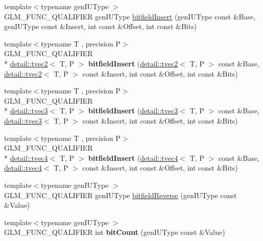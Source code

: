 \begin{DoxyCompactItemize}
\item 
{\footnotesize template$<$typename gen\-I\-U\-Type $>$ }\\G\-L\-M\-\_\-\-F\-U\-N\-C\-\_\-\-Q\-U\-A\-L\-I\-F\-I\-E\-R gen\-I\-U\-Type \hyperlink{group__core__func__integer_ga7ab09972d52094d97d2480982e657dd0}{bitfield\-Insert} (gen\-I\-U\-Type const \&Base, gen\-I\-U\-Type const \&Insert, int const \&Offset, int const \&Bits)
\item 
\hypertarget{namespaceglm_a3fe5875041ab0644094ed8866cfbf414}{{\footnotesize template$<$typename T , precision P$>$ }\\G\-L\-M\-\_\-\-F\-U\-N\-C\-\_\-\-Q\-U\-A\-L\-I\-F\-I\-E\-R \\*
\hyperlink{structglm_1_1detail_1_1tvec2}{detail\-::tvec2}$<$ T, P $>$ {\bfseries bitfield\-Insert} (\hyperlink{structglm_1_1detail_1_1tvec2}{detail\-::tvec2}$<$ T, P $>$ const \&Base, \hyperlink{structglm_1_1detail_1_1tvec2}{detail\-::tvec2}$<$ T, P $>$ const \&Insert, int const \&Offset, int const \&Bits)}\label{namespaceglm_a3fe5875041ab0644094ed8866cfbf414}

\item 
\hypertarget{namespaceglm_ac119fb710c26ac07213e39e16ce02b39}{{\footnotesize template$<$typename T , precision P$>$ }\\G\-L\-M\-\_\-\-F\-U\-N\-C\-\_\-\-Q\-U\-A\-L\-I\-F\-I\-E\-R \\*
\hyperlink{structglm_1_1detail_1_1tvec3}{detail\-::tvec3}$<$ T, P $>$ {\bfseries bitfield\-Insert} (\hyperlink{structglm_1_1detail_1_1tvec3}{detail\-::tvec3}$<$ T, P $>$ const \&Base, \hyperlink{structglm_1_1detail_1_1tvec3}{detail\-::tvec3}$<$ T, P $>$ const \&Insert, int const \&Offset, int const \&Bits)}\label{namespaceglm_ac119fb710c26ac07213e39e16ce02b39}

\item 
\hypertarget{namespaceglm_ad9cf2cd98236c704a80098f2bc801fcf}{{\footnotesize template$<$typename T , precision P$>$ }\\G\-L\-M\-\_\-\-F\-U\-N\-C\-\_\-\-Q\-U\-A\-L\-I\-F\-I\-E\-R \\*
\hyperlink{structglm_1_1detail_1_1tvec4}{detail\-::tvec4}$<$ T, P $>$ {\bfseries bitfield\-Insert} (\hyperlink{structglm_1_1detail_1_1tvec4}{detail\-::tvec4}$<$ T, P $>$ const \&Base, \hyperlink{structglm_1_1detail_1_1tvec4}{detail\-::tvec4}$<$ T, P $>$ const \&Insert, int const \&Offset, int const \&Bits)}\label{namespaceglm_ad9cf2cd98236c704a80098f2bc801fcf}

\item 
{\footnotesize template$<$typename gen\-I\-U\-Type $>$ }\\G\-L\-M\-\_\-\-F\-U\-N\-C\-\_\-\-Q\-U\-A\-L\-I\-F\-I\-E\-R gen\-I\-U\-Type \hyperlink{group__core__func__integer_gac28880e609c6eeb0a28f1a54b1edc715}{bitfield\-Reverse} (gen\-I\-U\-Type const \&Value)
\item 
\hypertarget{namespaceglm_a3327aadbf9816a3f8b182cbd9bcb1aac}{{\footnotesize template$<$typename gen\-I\-U\-Type $>$ }\\G\-L\-M\-\_\-\-F\-U\-N\-C\-\_\-\-Q\-U\-A\-L\-I\-F\-I\-E\-R int {\bfseries bit\-Count} (gen\-I\-U\-Type const \&Value)}\label{namespaceglm_a3327aadbf9816a3f8b182cbd9bcb1aac}


\end{DoxyCompactItemize}
